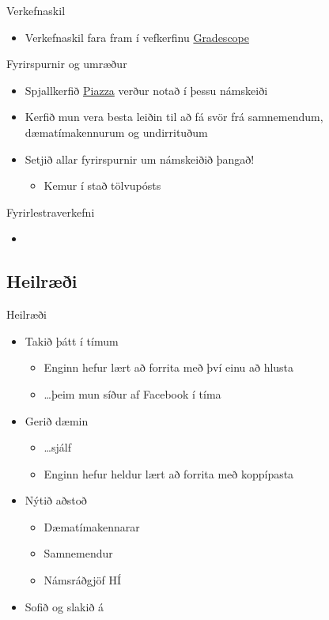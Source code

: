 \documentclass[handout]{beamer}
\begin{document}
\begin{frame}{Verkefnaskil}
\begin{itemize}
 \item Verkefnaskil fara fram í vefkerfinu \href{https://gradescope.com/}{Gradescope}
\end{itemize}
\end{frame}

\begin{frame}{Fyrirspurnir og umræður}
\label{frame:piazza}
\begin{itemize}
 \item Spjallkerfið \href{piazza.com/hi.is/fall2016/tl105g}{Piazza} verður notað í þessu námskeiði
 \item Kerfið mun vera besta leiðin til að fá svör frá samnemendum, dæmatímakennurum og undirrituðum
 \item Setjið allar fyrirspurnir um námskeiðið þangað!
 \begin{itemize}
  \item Kemur í stað tölvupósts
 \end{itemize}
\end{itemize}
\end{frame}

\begin{frame}{Fyrirlestraverkefni}
\begin{itemize}
 \item 
\end{itemize}

\end{frame}



\subsection{Heilræði}

\begin{frame}{Heilræði}
\pause
\begin{itemize}
 \item Takið þátt í tímum\pause
 \begin{itemize}
  \item Enginn hefur lært að forrita með því einu að hlusta \pause
  \item \ldots þeim mun síður af Facebook í tíma \pause
 \end{itemize}
 \item Gerið dæmin \pause
 \begin{itemize}
  \item \ldots sjálf
  \item Enginn hefur heldur lært að forrita með koppípasta \pause
 \end{itemize}
 \item Nýtið aðstoð
 \begin{itemize}
  \item Dæmatímakennarar
  \item Samnemendur
  \item Námsráðgjöf HÍ \pause
 \end{itemize}
 \item Sofið og slakið á
\end{itemize}
\end{frame}
\end{document}
